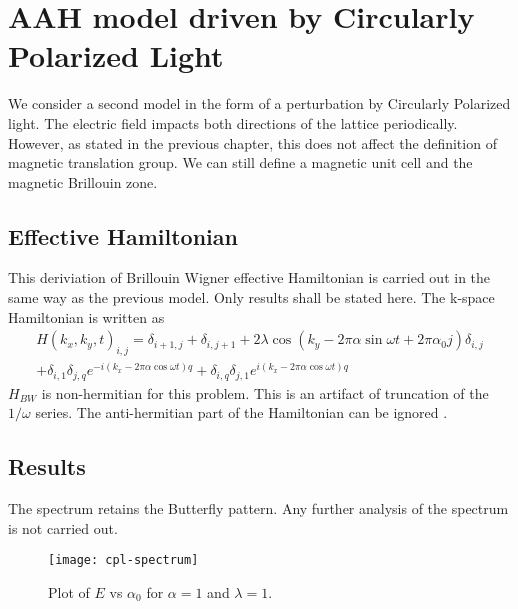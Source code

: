 %

\chapter{AAH model driven by Circularly Polarized Light}
We consider a second model in the form of a perturbation by Circularly Polarized light. The electric field impacts both directions of the lattice periodically. However, as
stated in the previous chapter, this does not affect the definition of magnetic translation group. We can still define a magnetic unit cell and the magnetic Brillouin zone.

\section{Effective Hamiltonian}
This deriviation of Brillouin Wigner effective Hamiltonian is carried out in the same way as the previous model. Only results shall be stated here.
The k-space Hamiltonian is written as
\begin{equation}
 \begin{split} H(k_x, k_y, t)_{i,j} = 
                   \delta_{i+1,j} + \delta_{i,j+1} + 2 \lambda \cos(k_y - 2\pi\alpha\sin{\omega t} + 2\pi\alpha_0 j)\delta_{i,j} \\
                   + \delta_{i,1}\delta_{j,q} e^{-i(k_x -2\pi\alpha\cos{\omega t})q}+\delta_{i,q}\delta_{j,1} e^{i(k_x -2\pi\alpha\cos{\omega t})q}
                  \end{split}
\end{equation}
%                   
$H_{BW}$ is non-hermitian for this problem. This is an artifact of truncation of the $1/\omega$ series. The anti-hermitian part of the Hamiltonian can be ignored \cite{mikami2016brillouin}.
\section{Results}
The spectrum retains the Butterfly pattern. Any further analysis of the spectrum is not carried out.
\begin{figure}[h]
 \centering
 \texttt{[image: cpl-spectrum]}
 \caption{Plot of $E$ vs $\alpha_0$ for $\alpha=1$ and $\lambda=1$.}
\end{figure}

